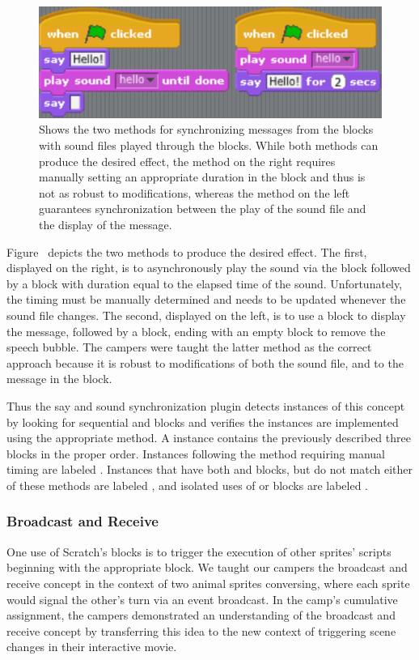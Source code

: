 \begin{figure}[!t]
\centering
\includegraphics[width=5.25in]{graphs/saysound.eps}
\caption{Shows the two methods for synchronizing messages from the \say{}
  blocks with sound files played through the \playsound{} blocks. While both
  methods can produce the desired effect, the method on the right requires
  manually setting an appropriate duration in the \sayfor{} block and thus is
  not as robust to modifications, whereas the method on the left guarantees
  synchronization between the play of the sound file and the display of the
  message.}  
\end{figure}

Figure~ depicts the two methods to produce the desired
effect. The first, displayed on the right, is to asynchronously play the sound
via the \playsound{} block followed by a \sayfor{} block with duration equal to
the elapsed time of the sound. Unfortunately, the timing must be manually
determined and needs to be updated whenever the sound file changes. The second,
displayed on the left, is to use a \say{} block to display the message,
followed by a \playsounddone{} block, ending with an empty \say{} block to
remove the speech bubble. The campers were taught the latter method as the
correct approach because it is robust to modifications of both the sound file,
and to the message in the \say{} block.

Thus the say and sound synchronization plugin detects instances of this concept
by looking for sequential \say{} and \playsound{} blocks and verifies the
instances are implemented using the appropriate method.  A \correct{} instance
contains the previously described three blocks in the proper order.  Instances
following the method requiring manual timing are labeled \semincor{}. Instances
that have both \say{} and \playsound{} blocks, but do not match either of these
methods are labeled \incor{}, and isolated uses of \say{} or \playsound{}
blocks are labeled \incom{}.


\subsubsection{Broadcast and Receive}
One use of Scratch's \broadcast{} blocks is to trigger the execution of other
sprites' scripts beginning with the appropriate \receive{} block. We taught our
campers the broadcast and receive concept in the context of two animal sprites
conversing, where each sprite would signal the other's turn via an event
broadcast. In the camp's cumulative assignment, the campers demonstrated an
understanding of the broadcast and receive concept by transferring this idea to
the new context of triggering scene changes in their interactive movie.

